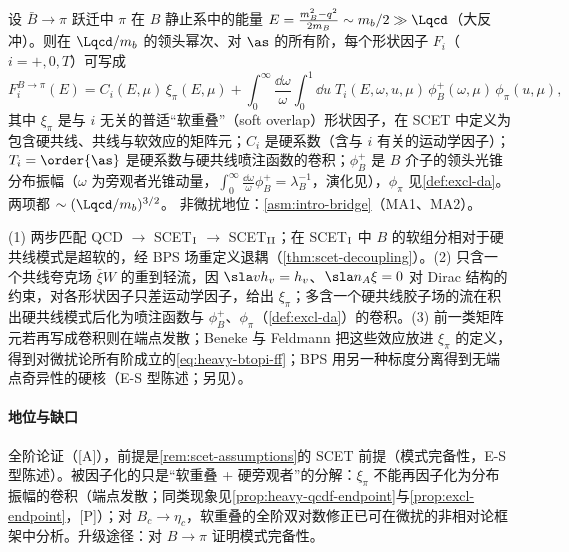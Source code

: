 \begin{proposition}\label{prop:heavy-btopi-ff}
设 $\bar B\to\pi$ 跃迁中 $\pi$ 在 $B$ 静止系中的能量 $E=\frac{m_B^2-q^2}{2m_B}\sim m_b/2\gg\Lqcd$（大反冲）。则在 $\Lqcd/m_b$ 的领头幂次、对 $\as$ 的所有阶，每个形状因子 $F_i$（$i=+,0,T$）可写成
\begin{equation}\label{eq:heavy-btopi-ff}
F_i^{B\to\pi}(E)=C_i(E,\mu)\,\xi_\pi(E,\mu)+\int_0^\infty\frac{\dd\omega}{\omega}\int_0^1\dd u\;T_i(E,\omega,u,\mu)\,\phi_B^+(\omega,\mu)\,\phi_\pi(u,\mu),
\end{equation}
其中 $\xi_\pi$ 是与 $i$ 无关的普适“软重叠”（soft overlap）形状因子，在 SCET 中定义为包含硬共线、共线与软效应的矩阵元；$C_i$ 是硬系数（含与 $i$ 有关的运动学因子）；$T_i=\order{\as}$ 是硬系数与硬共线喷注函数的卷积；$\phi_B^+$ 是 $B$ 介子的领头光锥分布振幅（$\omega$ 为旁观者光锥动量，$\int_0^\infty\frac{\dd\omega}{\omega}\phi_B^+=\lambda_B^{-1}$\cite{Grozin:1996pq}，演化见\cite{Lange:2003ff}），$\phi_\pi$ 见\cref{def:excl-da}。两项都 $\sim(\Lqcd/m_b)^{3/2}$。
非微扰地位：\cref{asm:intro-bridge}（MA1、MA2）。
\end{proposition}

\begin{proofsketch}
(1) 两步匹配 QCD $\to$ SCET$_{\rm I}$ $\to$ SCET$_{\rm II}$；在 SCET$_{\rm I}$ 中 $B$ 的软组分相对于硬共线模式是超软的，经 BPS 场重定义退耦（\cref{thm:scet-decoupling}）。(2) 只含一个共线夸克场 $\bar\xi W$ 的重到轻流，因 $\sla vh_v=h_v$、$\sla n_A\xi=0$ 对 Dirac 结构的约束，对各形状因子只差运动学因子，给出 $\xi_\pi$；多含一个硬共线胶子场的流在积出硬共线模式后化为喷注函数与 $\phi_B^+$、$\phi_\pi$（\cref{def:excl-da}）的卷积。(3) 前一类矩阵元若再写成卷积则在端点发散；Beneke 与 Feldmann 把这些效应放进 $\xi_\pi$ 的定义，得到对微扰论所有阶成立的\cref{eq:heavy-btopi-ff}\cite{Beneke:2003pa}；BPS 用另一种标度分离得到无端点奇异性的硬核\cite{Bauer:2002aj}（E-S 型陈述；另见\cite{Hill:2002vw,Beneke:2005gs}）。
\end{proofsketch}

\paragraph{地位与缺口}
全阶论证（[A]），前提是\cref{rem:scet-assumptions}的 SCET 前提（模式完备性，E-S 型陈述）。被因子化的只是“软重叠 + 硬旁观者”的分解：$\xi_\pi$ 不能再因子化为分布振幅的卷积（端点发散；同类现象见\cref{prop:heavy-qcdf-endpoint}与\cref{prop:excl-endpoint}，[P]）；对 $B_c\to\eta_c$，软重叠的全阶双对数修正已可在微扰的非相对论框架中分析\cite{Bell:2024bxg}。升级途径：对 $B\to\pi$ 证明模式完备性。

